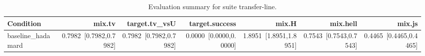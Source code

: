 \begin{table}[t]
\centering
\caption{Evaluation summary for suite transfer-line.}
\label{tab:eval_transfer-line}
\begin{tabular}{lrrrrrr}
\toprule
Condition & mix.tv & target.tv\_vsU & target.success & mix.H & mix.hell & mix.js \\
\midrule
baseline\_hadamard & 0.7982~[0.7982,0.7982] & 0.7982~[0.7982,0.7982] & 0.0000~[0.0000,0.0000] & 1.8951~[1.8951,1.8951] & 0.7543~[0.7543,0.7543] & 0.4465~[0.4465,0.4465] \\
\bottomrule
\end{tabular}
\end{table}
